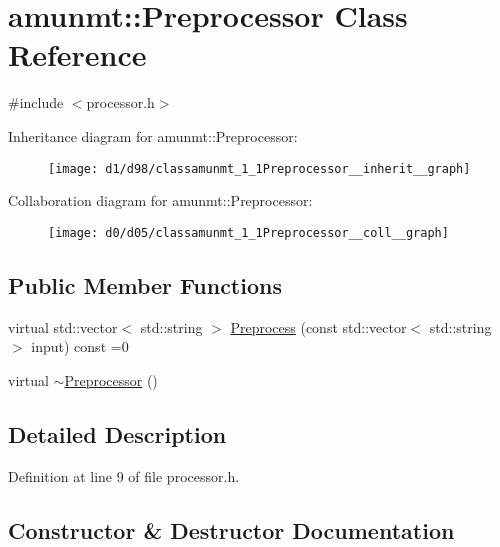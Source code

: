\hypertarget{classamunmt_1_1Preprocessor}{}\section{amunmt\+:\+:Preprocessor Class Reference}
\label{classamunmt_1_1Preprocessor}


{\ttfamily \#include $<$processor.\+h$>$}



Inheritance diagram for amunmt\+:\+:Preprocessor\+:
\nopagebreak
\begin{figure}[H]
\begin{center}
\leavevmode
\texttt{[image: d1/d98/classamunmt\_1\_1Preprocessor\_\_inherit\_\_graph]}
\end{center}
\end{figure}


Collaboration diagram for amunmt\+:\+:Preprocessor\+:
\nopagebreak
\begin{figure}[H]
\begin{center}
\leavevmode
\texttt{[image: d0/d05/classamunmt\_1\_1Preprocessor\_\_coll\_\_graph]}
\end{center}
\end{figure}
\subsection*{Public Member Functions}
\begin{DoxyCompactItemize}
\item 
virtual std\+::vector$<$ std\+::string $>$ \hyperlink{classamunmt_1_1Preprocessor_a9b65510af5c66a793f4651d2caa8e67a}{Preprocess} (const std\+::vector$<$ std\+::string $>$ input) const =0
\item 
virtual \hyperlink{classamunmt_1_1Preprocessor_a88c99ac6d5f9865a6c2b3817d2cc603c}{$\sim$\+Preprocessor} ()
\end{DoxyCompactItemize}


\subsection{Detailed Description}


Definition at line 9 of file processor.\+h.



\subsection{Constructor \& Destructor Documentation}
